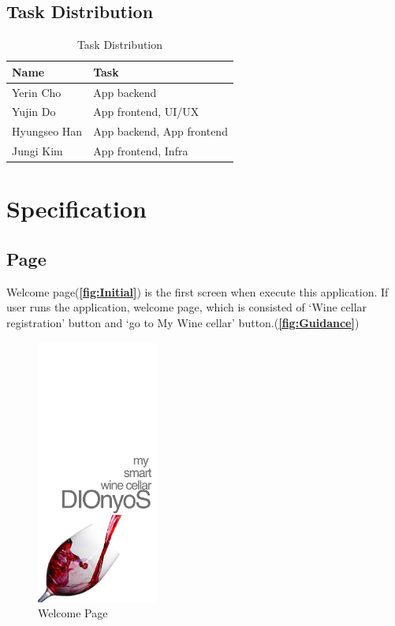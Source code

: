 \documentclass[sigconf, nonacm]{acmart}
\begin{document}
\subsection{Task Distribution}
\begin{table}[hb]%
  \caption{Task Distribution}
  \label{tab:freq}
  \begin{tabular}{|p{3cm}|p{4.4cm}|}
    \toprule
    \textbf{Name} & \textbf{Task}\\
    \midrule
    Yerin Cho & App backend \\
    Yujin Do & App frontend, UI/UX \\
    Hyungseo Han & App backend, App frontend \\
    Jungi Kim & App frontend, Infra \\
  \bottomrule
\end{tabular}
\end{table}

\section{Specification}

\noindent \subsection{Page}
Welcome page(\textbf{\autoref{fig:Initial}}) is the first screen when execute this application. If user runs the application, welcome page, which is consisted of ‘Wine cellar registration’ button and ‘go to My Wine cellar’ button.(\textbf{\autoref{fig:Guidance}})
\begin{figure}
  \centering
  \includegraphics[width=4cm]{firstpage.png}
  \caption{Welcome Page}
  \label{fig:Initial}
\end{figure}
\end{document}
